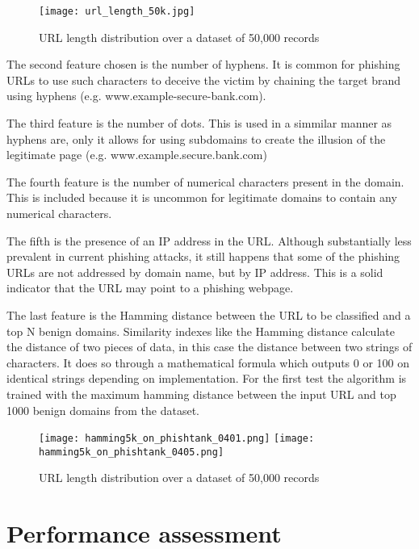 \begin{figure}[t]
	\centering
	\texttt{[image: url\_length\_50k.jpg]}
	\caption{URL length distribution over a dataset of 50,000 records}
	\label{fig:URL_LENGTH_DISTRIBUTION}
\end{figure}

The second feature chosen is the number of hyphens. It is common for phishing URLs to use such characters to deceive the victim by chaining the target brand using hyphens (e.g. www.example-secure-bank.com).

The third feature is the number of dots. This is used in a simmilar manner as hyphens are, only it allows for using subdomains to create the illusion of the legitimate page (e.g. www.example.secure.bank.com)

The fourth feature is the number of numerical characters present in the domain. This is included because it is uncommon for legitimate domains to contain any numerical characters.

The fifth is the presence of an IP address in the URL. Although substantially less prevalent in current phishing attacks, it still happens that some of the phishing URLs are not addressed by domain name, but by IP address. This is a solid indicator that the URL may point to a phishing webpage.

The last feature is the Hamming distance between the URL to be classified and a top N benign domains. Similarity indexes like the Hamming distance calculate the distance of two pieces of data, in this case the distance between two strings of characters. It does so through a mathematical formula which outputs 0 or 100 on identical strings depending on implementation. For the first test the algorithm is trained with the maximum hamming distance between the input URL and top 1000 benign domains from the \cite{MAJESTIC_MILLION} dataset.

\begin{figure}
	\centering
	\texttt{[image: hamming5k\_on\_phishtank\_0401.png]}
	\texttt{[image: hamming5k\_on\_phishtank\_0405.png]}
	\caption{URL length distribution over a dataset of 50,000 records}
	\label{fig:HAMMING_ON_PHISHTANK_0401}
\end{figure}

\section{Performance assessment}

